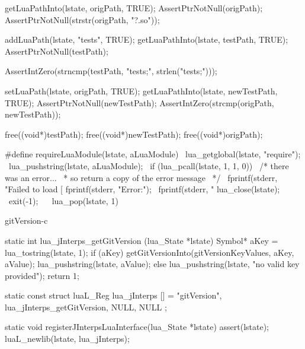 
\startCTest
  getLuaPathInto(lstate, origPath, TRUE);
  AssertPtrNotNull(origPath);
  AssertPtrNotNull(strstr(origPath, "?.so"));

  addLuaPath(lstate, "tests", TRUE);
  getLuaPathInto(lstate, testPath, TRUE);
  AssertPtrNotNull(testPath);

  AssertIntZero(strncmp(testPath, "tests;", strlen("tests;")));
  
  setLuaPath(lstate, origPath, TRUE);
  getLuaPathInto(lstate, newTestPath, TRUE);
  AssertPtrNotNull(newTestPath);
  AssertIntZero(strcmp(origPath, newTestPath));
  
  free((void*)testPath);
  free((void*)newTestPath);
  free((void*)origPath);
\stopCTest
\stopTestCase
\stopTestSuite


\startCHeader
#define requireLuaModule(lstate, aLuaModule)              \
  lua_getglobal(lstate, "require");                       \
  lua_pushstring(lstate, aLuaModule);                     \
  if (lua_pcall(lstate, 1, 1, 0)) {                       \
    /* there was an error...                              \
     * so return a copy of the error message              \
     */                                                   \
    fprintf(stderr, "Failed to load [%
    fprintf(stderr, "Error:\n");                          \
    fprintf(stderr, "%
    lua_close(lstate);                                    \
    exit(-1);                                             \
  }                                                       \
  lua_pop(lstate, 1)
\stopCHeader

\stopTestSuite

\component gitVersion-c

\startCCode
static int lua_jInterps_getGitVersion (lua_State *lstate) {
  Symbol* aKey   = lua_tostring(lstate, 1);
  if (aKey) {
    getGitVersionInto(gitVersionKeyValues, aKey, aValue);
    lua_pushstring(lstate, aValue);
  } else {
    lua_pushstring(lstate, "no valid key provided");
  }
  return 1;
}
\stopCCode

\startCCode
static const struct luaL_Reg lua_jInterps [] = {
  {"gitVersion", lua_jInterps_getGitVersion},
  {NULL, NULL}
};
\stopCCode

\startCCode
static void registerJInterpsLuaInterface(lua_State *lstate) {
  assert(lstate);
  luaL_newlib(lstate, lua_jInterps);
}
\stopCCode

